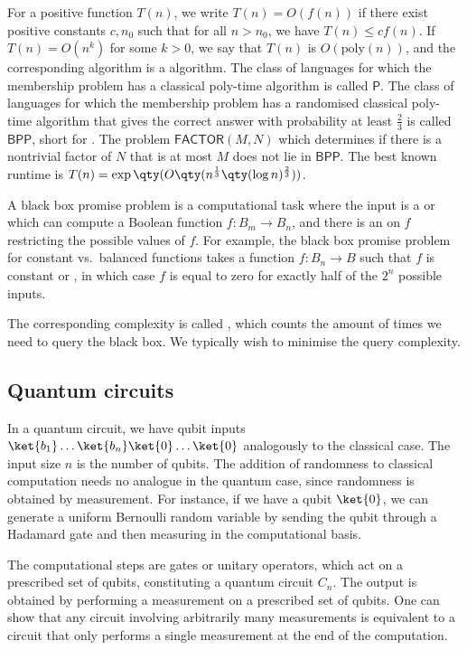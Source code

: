 For a positive function $T(n)$, we write $T(n) = O(f(n))$ if there exist positive constants $c, n_0$ such that for all $n > n_0$, we have $T(n) \leq cf(n)$.
If $T(n) = O(n^k)$ for some $k > 0$, we say that $T(n)$ is $O(\mathrm{poly}(n))$, and the corresponding algorithm is a  algorithm.
The class of languages for which the membership problem has a classical poly-time algorithm is called $\mathsf{P}$.
The class of languages for which the membership problem has a randomised classical poly-time algorithm that gives the correct answer with probability at least $\frac{2}{3}$ is called $\mathsf{BPP}$, short for .
The problem $\mathsf{FACTOR}(M,N)$ which determines if there is a nontrivial factor of $N$ that is at most $M$ does not lie in $\mathsf{BPP}$.
The best known runtime is $T(n) = \exp\qty(O\qty(n^{\frac{1}{3}}\qty(\log n)^\frac{2}{3}))$.

A black box promise problem is a computational task where the input is a  or  which can compute a Boolean function $f \colon B_m \to B_n$, and there is an  on $f$ restricting the possible values of $f$.
For example, the black box promise problem for constant vs.\ balanced functions takes a function $f \colon B_n \to B$ such that $f$ is constant or , in which case $f$ is equal to zero for exactly half of the $2^n$ possible inputs.

The corresponding complexity is called , which counts the amount of times we need to query the black box.
We typically wish to minimise the query complexity.

\subsection{Quantum circuits}
In a quantum circuit, we have qubit inputs $\ket{b_1} \dots \ket{b_n} \ket{0} \dots \ket{0}$ analogously to the classical case.
The input size $n$ is the number of qubits.
The addition of randomness to classical computation needs no analogue in the quantum case, since randomness is obtained by measurement.
For instance, if we have a qubit $\ket{0}$, we can generate a uniform Bernoulli random variable by sending the qubit through a Hadamard gate and then measuring in the computational basis.

The computational steps are gates or unitary operators, which act on a prescribed set of qubits, constituting a quantum circuit $C_n$.
The output is obtained by performing a measurement on a prescribed set of qubits.
One can show that any circuit involving arbitrarily many measurements is equivalent to a circuit that only performs a single measurement at the end of the computation.

